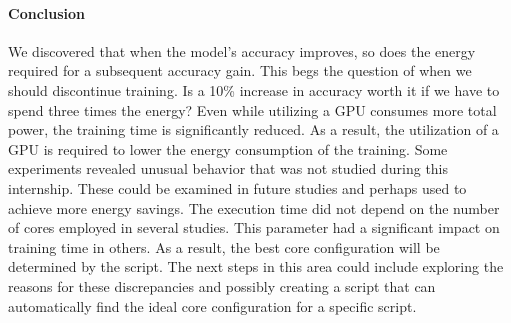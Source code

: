 \paragraph{Conclusion}
We discovered that when the model's accuracy improves, so does the energy required for a subsequent accuracy gain.
This begs the question of when we should discontinue training.
Is a 10\% increase in accuracy worth it if we have to spend three times the energy?
Even while utilizing a GPU consumes more total power, the training time is significantly reduced.
As a result, the utilization of a GPU is required to lower the energy consumption of the training.
Some experiments revealed unusual behavior that was not studied during this internship.
These could be examined in future studies and perhaps used to achieve more energy savings.
The execution time did not depend on the number of cores employed in several studies.
This parameter had a significant impact on training time in others.
As a result, the best core configuration will be determined by the script.
The next steps in this area could include exploring the reasons for these discrepancies and possibly creating a script that can automatically find the ideal core configuration for a specific script.




